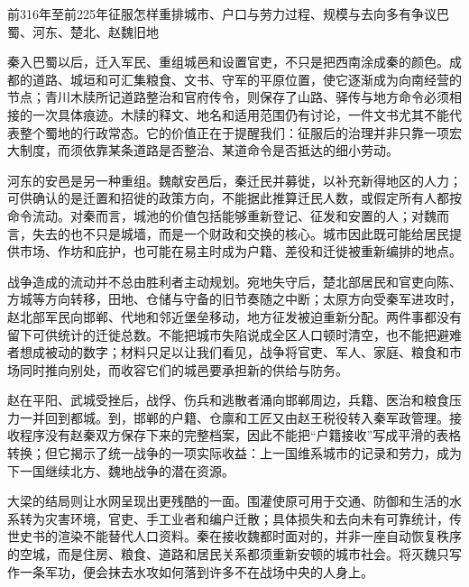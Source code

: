 \begin{event}{前316年至前225年}{征服怎样重排城市、户口与劳力}{过程、规模与去向多有争议}{巴蜀、河东、楚北、赵魏旧地}

秦入巴蜀以后，迁入军民、重组城邑和设置官吏，不只是把西南涂成秦的颜色。成都的道路、城垣和可汇集粮食、文书、守军的平原位置，使它逐渐成为向南经营的节点；青川木牍所记道路整治和官府传令，则保存了山路、驿传与地方命令必须相接的一次具体痕迹。木牍的释文、地名和适用范围仍有讨论，一件文书尤其不能代表整个蜀地的行政常态。它的价值正在于提醒我们：征服后的治理并非只靠一项宏大制度，而须依靠某条道路是否整治、某道命令是否抵达的细小劳动。

河东的安邑是另一种重组。魏献安邑后，秦迁民并募徙，以补充新得地区的人力；可供确认的是迁置和招徙的政策方向，不能据此推算迁民人数，或假定所有人都按命令流动。对秦而言，城池的价值包括能够重新登记、征发和安置的人；对魏而言，失去的也不只是城墙，而是一个财政和交换的核心。城市因此既可能给居民提供市场、作坊和庇护，也可能在易主时成为户籍、差役和迁徙被重新编排的地点。

战争造成的流动并不总由胜利者主动规划。宛地失守后，楚北部居民和官吏向陈、方城等方向转移，田地、仓储与守备的旧节奏随之中断；太原方向受秦军进攻时，赵北部军民向邯郸、代地和邻近堡垒移动，地方征发被迫重新分配。两件事都没有留下可供统计的迁徙总数。不能把城市失陷说成全区人口顿时清空，也不能把避难者想成被动的数字；材料只足以让我们看见，战争将官吏、军人、家庭、粮食和市场同时推向别处，而收容它们的城邑要承担新的供给与防务。

赵在平阳、武城受挫后，战俘、伤兵和逃散者涌向邯郸周边，兵籍、医治和粮食压力一并回到都城。到，邯郸的户籍、仓廪和工匠又由赵王税役转入秦军政管理。接收程序没有赵秦双方保存下来的完整档案，因此不能把“户籍接收”写成平滑的表格转换；但它揭示了统一战争的一项实际收益：上一国维系城市的记录和劳力，成为下一国继续北方、魏地战争的潜在资源。

大梁的结局则让水网呈现出更残酷的一面。围灌使原可用于交通、防御和生活的水系转为灾害环境，官吏、手工业者和编户迁散；具体损失和去向未有可靠统计，传世史书的渲染不能替代人口资料。秦在接收魏都时面对的，并非一座自动恢复秩序的空城，而是住房、粮食、道路和居民关系都须重新安顿的城市社会。将灭魏只写作一条军功，便会抹去水攻如何落到许多不在战场中央的人身上。
\end{event}

